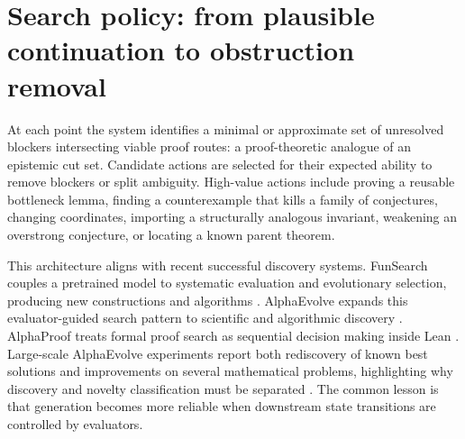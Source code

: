 \section{Search policy: from plausible continuation to obstruction removal}

At each point the system identifies a minimal or approximate set of unresolved blockers intersecting viable proof routes: a proof-theoretic analogue of an epistemic cut set. Candidate actions are selected for their expected ability to remove blockers or split ambiguity. High-value actions include proving a reusable bottleneck lemma, finding a counterexample that kills a family of conjectures, changing coordinates, importing a structurally analogous invariant, weakening an overstrong conjecture, or locating a known parent theorem.

This architecture aligns with recent successful discovery systems. FunSearch couples a pretrained model to systematic evaluation and evolutionary selection, producing new constructions and algorithms \cite{romera2024}. AlphaEvolve expands this evaluator-guided search pattern to scientific and algorithmic discovery \cite{novikov2025}. AlphaProof treats formal proof search as sequential decision making inside Lean \cite{hubert2025}. Large-scale AlphaEvolve experiments report both rediscovery of known best solutions and improvements on several mathematical problems, highlighting why discovery and novelty classification must be separated \cite{georgiev2025}. The common lesson is that generation becomes more reliable when downstream state transitions are controlled by evaluators.
